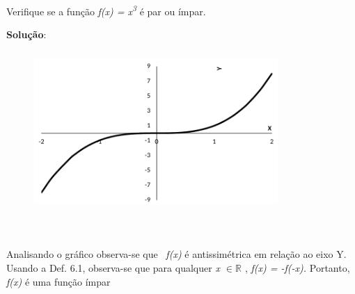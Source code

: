 \begin{texemplo}

Verifique se a função \textit{f(x) = x\textsuperscript{3}} é par ou ímpar.

\textbf{Solução}: 

\begin{figure}[H]
	\begin{Center}
		\includegraphics[width=3.65in,height=2.4in]{capitulos/outras_funcoes/media/image27.pdf}
	\end{Center}
\end{figure}

~~

Analisando o gráfico observa-se que~ \textit{f(x)} é antissimétrica em relação ao eixo Y. Usando a Def. 6.1, observa-se que para qualquer \textit{x $ \in \mathbb{R} $ \textbf{ }}, \textit{f(x) = -f(-x).} Portanto, \textit{f(x)} é uma função ímpar \qedsymbol{} 
\end{texemplo}

